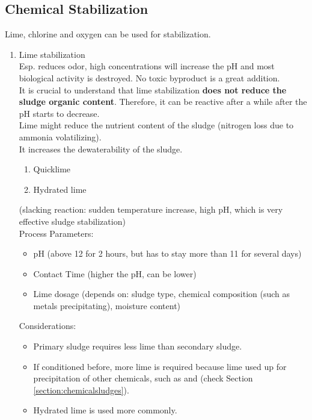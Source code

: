 \documentclass{article}
\numberwithin{equation}{section}
\begin{document}
\subsection{Chemical Stabilization}
Lime, chlorine and oxygen can be used for stabilization.
\begin{enumerate}
    \item Lime stabilization\\
    Esp. reduces odor, high concentrations will increase the pH and most biological activity is destroyed. No toxic byproduct is a great addition.\\
    It is crucial to understand that lime stabilization \textbf{does not reduce the sludge organic content}. Therefore, it can be reactive after a while after the pH starts to decrease.\\
    Lime might reduce the nutrient content of the sludge (nitrogen loss due to ammonia volatilizing).\\
    It increases the dewaterability of the sludge.
    \begin{enumerate}
        \item Quicklime
        \item Hydrated lime
    \end{enumerate}
     (slacking reaction: sudden temperature increase, high pH, which is very effective sludge stabilization)\\
    Process Parameters:
    \begin{itemize}
        \item pH (above 12 for 2 hours, but has to stay more than 11 for several days)
        \item Contact Time (higher the pH, can be lower)
        \item Lime dosage (depends on: sludge type, chemical composition (such as metals precipitating), moisture content)
    \end{itemize}
    Considerations:
    \begin{itemize}
        \item Primary sludge requires less lime than secondary sludge.
        \item If conditioned before, more lime is required because lime used up for precipitation of other chemicals, such as  and  (check Section \ref{section:chemicalsludges}).
        \item Hydrated lime is used more commonly.
    \end{itemize}
\end{enumerate}
\end{document}
